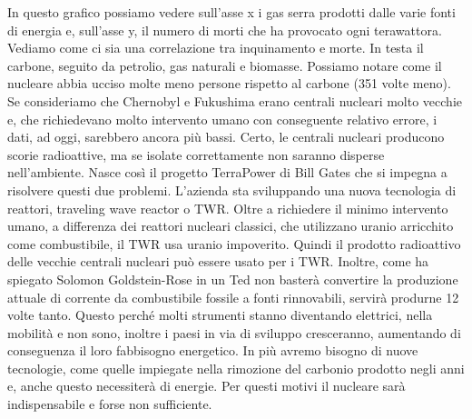 \documentclass[12pt]{book} %
\begin{document}
In questo grafico possiamo vedere sull'asse x i gas serra prodotti dalle varie fonti di energia e,
sull'asse y, il numero di morti che ha provocato ogni terawattora. Vediamo come ci sia una
correlazione tra inquinamento e morte. In testa il carbone, seguito da petrolio, gas naturali e biomasse. Possiamo
notare come il nucleare abbia ucciso molte meno persone rispetto al carbone (351 volte meno). Se consideriamo che
Chernobyl e Fukushima erano centrali nucleari molto vecchie e, che richiedevano molto intervento umano con conseguente
relativo errore, i dati, ad oggi, sarebbero ancora più bassi. Certo, le centrali nucleari producono scorie radioattive,
ma se isolate correttamente non saranno disperse nell'ambiente. Nasce così il progetto
TerraPower di Bill Gates che si impegna a risolvere questi due
problemi. L'azienda sta sviluppando una nuova tecnologia di reattori, traveling wave reactor o
TWR. Oltre a richiedere il minimo intervento umano, a differenza dei reattori nucleari classici, che utilizzano uranio
arricchito come combustibile, il TWR usa uranio impoverito. Quindi il prodotto radioattivo delle vecchie centrali
nucleari può essere usato per i TWR. Inoltre, come ha spiegato Solomon Goldstein-Rose in un
Ted non basterà convertire la produzione attuale di corrente da combustibile fossile a fonti rinnovabili, servirà
produrne 12 volte tanto. Questo perché molti strumenti stanno diventando elettrici, nella mobilità e non sono, inoltre
i paesi in via di sviluppo cresceranno, aumentando di conseguenza il loro fabbisogno energetico. In più avremo bisogno
di nuove tecnologie, come quelle impiegate nella rimozione del carbonio prodotto negli anni e, anche questo necessiterà
di energie. Per questi motivi il nucleare sarà indispensabile e forse non sufficiente.
\end{document}
